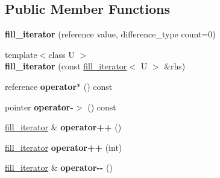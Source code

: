\subsection*{Public Member Functions}
\begin{DoxyCompactItemize}
\item 
\hypertarget{classyasli__nstd_1_1fill__iterator_a79e237f98664f20d954839155266c9ea}{}{\bfseries fill\+\_\+iterator} (reference value, difference\+\_\+type count=0)\label{classyasli__nstd_1_1fill__iterator_a79e237f98664f20d954839155266c9ea}

\item 
\hypertarget{classyasli__nstd_1_1fill__iterator_a0d0a0f6ad3fc6077af33ddf824a8713c}{}{\footnotesize template$<$class U $>$ }\\{\bfseries fill\+\_\+iterator} (const \hyperlink{classyasli__nstd_1_1fill__iterator}{fill\+\_\+iterator}$<$ U $>$ \&rhs)\label{classyasli__nstd_1_1fill__iterator_a0d0a0f6ad3fc6077af33ddf824a8713c}

\item 
\hypertarget{classyasli__nstd_1_1fill__iterator_ab6d34b224052859e80048868f906ae85}{}reference {\bfseries operator$\ast$} () const \label{classyasli__nstd_1_1fill__iterator_ab6d34b224052859e80048868f906ae85}

\item 
\hypertarget{classyasli__nstd_1_1fill__iterator_ac772b043ad7a3a58218ebba44b5a4a25}{}pointer {\bfseries operator-\/$>$} () const \label{classyasli__nstd_1_1fill__iterator_ac772b043ad7a3a58218ebba44b5a4a25}

\item 
\hypertarget{classyasli__nstd_1_1fill__iterator_ae07e28c708c149498df46925b607081b}{}\hyperlink{classyasli__nstd_1_1fill__iterator}{fill\+\_\+iterator} \& {\bfseries operator++} ()\label{classyasli__nstd_1_1fill__iterator_ae07e28c708c149498df46925b607081b}

\item 
\hypertarget{classyasli__nstd_1_1fill__iterator_ae9b8b3e98e742c3c8aa4f5fafb858501}{}\hyperlink{classyasli__nstd_1_1fill__iterator}{fill\+\_\+iterator} {\bfseries operator++} (int)\label{classyasli__nstd_1_1fill__iterator_ae9b8b3e98e742c3c8aa4f5fafb858501}

\item 
\hypertarget{classyasli__nstd_1_1fill__iterator_ae014e7efb537544076ae843b1f1ef71e}{}\hyperlink{classyasli__nstd_1_1fill__iterator}{fill\+\_\+iterator} \& {\bfseries operator-\/-\/} ()\label{classyasli__nstd_1_1fill__iterator_ae014e7efb537544076ae843b1f1ef71e}


\end{DoxyCompactItemize}
